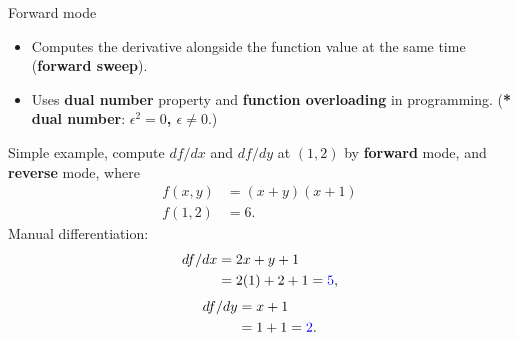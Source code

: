 \documentclass{beamer}
\begin{document}
\begin{frame}{Forward mode}
    \fontsize{9}{6}\selectfont
    \begin{itemize}
        \item Computes the derivative alongside the function value at the same time (\textbf{forward sweep}).
        \item Uses \textbf{dual number} property and \textbf{function overloading} in programming. (\textbf{* dual number}: {\color{red}\textbf{$\epsilon^2 = 0$, $\epsilon \neq 0$}}.)
    \end{itemize}
    Simple example, compute $df/dx$ and $df/dy$ at $(1,2)$ by \textbf{forward} mode, and \textbf{reverse} mode, where
    \begin{equation}
        \begin{split}
            f(x, y) & = (x + y)(x + 1) \\
            f(1, 2) & = 6.
        \end{split}
        \label{eq:fad}
    \end{equation}
    Manual differentiation:
    \begin{equation}
        \begin{split}
            df/dx & = 2x + y + 1 \\
            & = 2(1) + 2 + 1 = {\color{blue}5},
        \end{split}
        \label{eq:dfdx}
    \end{equation}
    \begin{equation}
        \begin{split}
            df/dy & = x + 1 \\
            & = 1 + 1 = {\color{blue}2}.
        \end{split}
        \label{eq:dfdy}
    \end{equation}
\end{frame}
\end{document}

